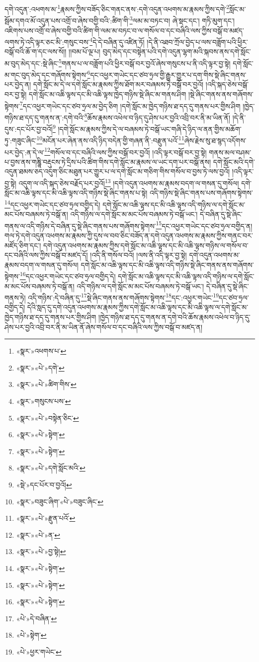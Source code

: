 དགེ་འདུན་:འཕགས་མ་\footnote{«སྣར་»འཕགས་པ་}རྣམས་ཀྱིས་བཟོད་ཅིང་གནང་ནས་:དགེ་འདུན་འཕགས་མ་རྣམས་ཀྱིས་དགེ་\footnote{«སྣར་»«པེ་»དགེ་}སློང་མ་སྦོམ་དགའ་མོ་འདུན་པས་འགྲོ་བ་ཞེས་བགྱི་བའི་:ཚིག་གི་\footnote{«སྣར་»«པེ་»ཚིག་གིས་}ལམ་མ་བཏང་བ། ཞེ་སྡང་དང་། གཏི་མུག་དང་། འཇིགས་པས་འགྲོ་བ་ཞེས་བགྱི་བའི་ཚིག་གི་ལམ་མ་བཏང་བ་ལ་གསོལ་བ་དང་བཞིའི་ལས་ཀྱིས་བསྒོ་བ་མཛད་ལགས་ཏེ་འདི་ལྟར་ཅང་མི་:གསུང་བས་\footnote{«སྣར་»གསུངས་པས་}དེ་དེ་བཞིན་དུ་འཛིན་ཏོ། །དེ་ནི་འཐབ་ཀྲོལ་བྱེད་པ་ལས་བཟློག་པའི་ཕྱིར་བསྒོ་བའི་ཆོ་ག་དང་ལས་སོ།། །།བམ་པོ་ལྔ་པ། བུད་མེད་དང་བསྟེན་པའི་དགེ་འདུན་ལྷག་མའི་སྐབས་ནས་དགེ་སློང་མ་བུད་མེད་དང་:སྡེ་ཞིང་\footnote{«སྣར་»«པེ་»བསྟེན་ཅིང་}གནས་པ་ལ་བཟློག་པའི་ཕྱིར་བསྒོ་བར་བྱའོ་ཞེས་གསུངས་པ་ནི་འདི་ལྟར་བྱ་སྟེ། དགེ་སློང་མ་གང་བུད་མེད་དང་གཞོགས་སྟེགས་\footnote{«སྣར་»«པེ་»སྟེག་}དང་འཕྱར་གཡེང་དང་ཙབ་ཧྲལ་གྱི་རྒྱུར་གྱུར་པ་དག་གིས་སྡེ་ཞིང་གནས་པར་བྱེད་ན། དགེ་སློང་མ་དེ་ལ་དགེ་སློང་མ་རྣམས་ཀྱིས་ཐོག་མར་བཞམས་ཏེ་བསྒོ་བར་བྱའོ། །འདི་སྐད་ཅེས་བསྒོ་བར་བྱ་སྟེ། དགེ་སློང་མ་འཆི་ལྟས་དང་མི་འཆི་ལྟས་ཁྱེད་གཉིས་སྡེ་ཞིང་མ་གནས་ཤིག །སྡེ་ཞིང་གནས་ནས་གཞོགས་སྟེགས་\footnote{«སྣར་»«པེ་»སྟེག་}དང་འཕྱར་གཡེང་དང་ཙབ་ཧྲལ་མ་བྱེད་ཅིག །དགེ་སློང་མ་ཁྱེད་གཉིས་ཐ་དད་དུ་གནས་པར་གྱིས་ཤིག །ཁྱེད་གཉིས་ཐ་དད་དུ་གནས་ན་:དགེ་བའི་\footnote{«སྣར་»«པེ་»དགེ་སློང་མའི་}ཆོས་རྣམས་འཕེལ་བ་ཉིད་དུ་ཤེས་པར་བྱའི་འབྲི་བར་ནི་མ་ཡིན་ནོ། །དེ་ནི་དུས་:དང་པོར་བྱ་བའོ།\footnote{«སྡེ་»དང་པོར་བ་བྱའོ།} །དགེ་སློང་མ་རྣམས་ཀྱིས་དེ་ལ་བཞམས་ཏེ་བསྒོ་ཡང་གཞི་དེ་ཉིད་ལ་ནན་གྱིས་མཆོག་ཏུ་:གཟུང་ཞིང་\footnote{«སྣར་»བཟུང་ཞིག་«པེ་»བཟུང་ཞིང་}མངོན་པར་ཞེན་ནས་འདི་ཉིད་བདེན་གྱི་གཞན་ནི་:བརྫུན་པའོ་\footnote{«སྣར་»«པེ་»རྫུན་པའོ་}ཞེས་རྗེས་སུ་ཐ་སྙད་འདོགས་པར་བྱེད་:ན་དེ་ལ་\footnote{«སྣར་»«པེ་»ན་}གསོལ་བ་དང་བཞིའི་ལས་ཀྱིས་བསྒོ་བར་བྱའོ། །འདི་ལྟར་བསྒོ་བར་བྱ་སྟེ། གནས་མལ་བཤམ་པ་བྱས་ནས་གཎྜཱི་བརྡུངས་ཏེ་དྲིས་པའི་ཚིག་གིས་དགེ་སློང་མ་རྣམས་ལ་ཡང་དག་པར་བསྒོ་ནས། དགེ་སློང་མའི་དགེ་འདུན་ཐམས་ཅད་འདུག་ཅིང་མཐུན་པར་གྱུར་པ་ལ་དགེ་སློང་མ་གཅིག་གིས་གསོལ་བ་བྱས་ཏེ་ལས་བྱའོ། །འདི་ལྟར་བྱ་སྟེ། འདུག་ལ་འདི་སྐད་ཅེས་བརྗོད་པར་བྱའོ།\footnote{«སྣར་»«པེ་»བྱ་སྟེ།} །དགེ་འདུན་འཕགས་མ་རྣམས་བདག་ལ་གསན་དུ་གསོལ། དགེ་སློང་མ་འཆི་ལྟས་དང་མི་འཆི་ལྟས་འདི་གཉིས་སྡེ་ཞིང་གནས་པ་སྟེ། འདི་གཉིས་སྡེ་ཞིང་གནས་པས་གཞོགས་སྟེགས་\footnote{«སྣར་»«པེ་»སྟེག་}དང་འཕྱར་གཡེང་དང་ཙབ་ཧྲལ་བགྱིད་དེ། དགེ་སློང་མ་འཆི་ལྟས་དང་མི་འཆི་ལྟས་འདི་གཉིས་ལ་དགེ་སློང་མ་མང་པོས་བཞམས་ཏེ་བསྒོ་ན། འདི་གཉིས་ལ་དགེ་སློང་མ་མང་པོས་བཞམས་ཏེ་བསྒོ་ཡང་། དེ་བཞིན་དུ་སྡེ་ཞིང་གནས་ལ་འདི་གཉིས་དེ་བཞིན་དུ་སྡེ་ཞིང་གནས་པས་གཞོགས་སྟེགས་\footnote{«སྣར་»«པེ་»སྟེག་}དང་འཕྱར་གཡེང་དང་ཙབ་ཧྲལ་བགྱིད་ན། གལ་ཏེ་དགེ་འདུན་འཕགས་མ་རྣམས་ཀྱི་དུས་ལ་བབ་ཅིང་བཟོད་ན་དགེ་འདུན་འཕགས་མ་རྣམས་ཀྱིས་གནང་བར་མཛོད་ཅིག་དང་། དགེ་འདུན་འཕགས་མ་རྣམས་ཀྱིས་དགེ་སློང་མ་འཆི་ལྟས་དང་མི་འཆི་ལྟས་གཉིས་ལ་གསོལ་བ་དང་བཞིའི་ལས་ཀྱིས་བསྒོ་བ་མཛད་དོ། །འདི་ནི་གསོལ་བའོ། །ལས་ནི་འདི་ལྟར་བྱ་སྟེ། དགེ་འདུན་འཕགས་མ་རྣམས་བདག་ལ་གསན་དུ་གསོལ། དགེ་སློང་མ་འཆི་ལྟས་དང་མི་འཆི་ལྟས་འདི་གཉིས་སྡེ་ཞིང་གནས་ནས་གཞོགས་སྟེགས་\footnote{«སྣར་»«པེ་»སྟེག་}དང་འཕྱར་གཡེང་དང་ཙབ་ཧྲལ་བགྱིད་དེ། དགེ་སློང་མ་འཆི་ལྟས་དང་མི་འཆི་ལྟས་འདི་གཉིས་ལ་དགེ་སློང་མ་མང་པོས་བཞམས་ཏེ་བསྒོ་ན། འདི་གཉིས་ལ་དགེ་སློང་མ་མང་པོས་བཞམས་ཏེ་བསྒོ་ཡང་། དེ་བཞིན་དུ་སྡེ་ཞིང་གནས་ཏེ། འདི་གཉིས་:དེ་བཞིན་དུ་\footnote{«པེ་»དེ་བཞིན་}སྡེ་ཞིང་གནས་ནས་གཞོགས་སྟེགས་\footnote{«པེ་»སྟེག་}དང་:འཕྱར་གཡེང་\footnote{«པེ་»ཕྱར་གཡེང་}དང་ཙབ་ཧྲལ་བགྱིད་དེ། དེའི་སླད་དུ་དགེ་འདུན་འཕགས་མ་རྣམས་ཀྱིས་དགེ་སློང་མ་འཆི་ལྟས་དང་མི་འཆི་ལྟས་ལ་དགེ་སློང་མ་ཁྱེད་གཉིས་ཐ་དད་དུ་གནས་པར་གྱིས་ཤིག །ཁྱེད་གཉིས་ཐ་དད་དུ་གནས་ན་དགེ་བའི་ཆོས་རྣམས་འཕེལ་བ་ཉིད་དུ་ཤེས་པར་བྱའི་འབྲི་བར་ནི་མ་ཡིན་ནོ་ཞེས་གསོལ་བ་དང་བཞིའི་ལས་ཀྱིས་བསྒོ་བ་མཛད་ན། 
